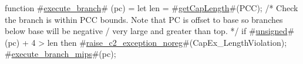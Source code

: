 function #\hyperref[sailMIPSzexecutezybranch]{execute\_branch}# (pc) = {
  let len = #\hyperref[sailMIPSzgetCapLength]{getCapLength}#(PCC);
  /* Check the branch is within PCC bounds. Note that PC is offset to
  base so branches below base will be negative / very large and
  greater than top. */
  if #\hyperref[sailMIPSzunsigned]{unsigned}#(pc) + 4 > len then
    #\hyperref[sailMIPSzraisezyc2zyexceptionzynoreg]{raise\_c2\_exception\_noreg}#(CapEx_LengthViolation);
  #\hyperref[sailMIPSzexecutezybranchzymips]{execute\_branch\_mips}#(pc); }
